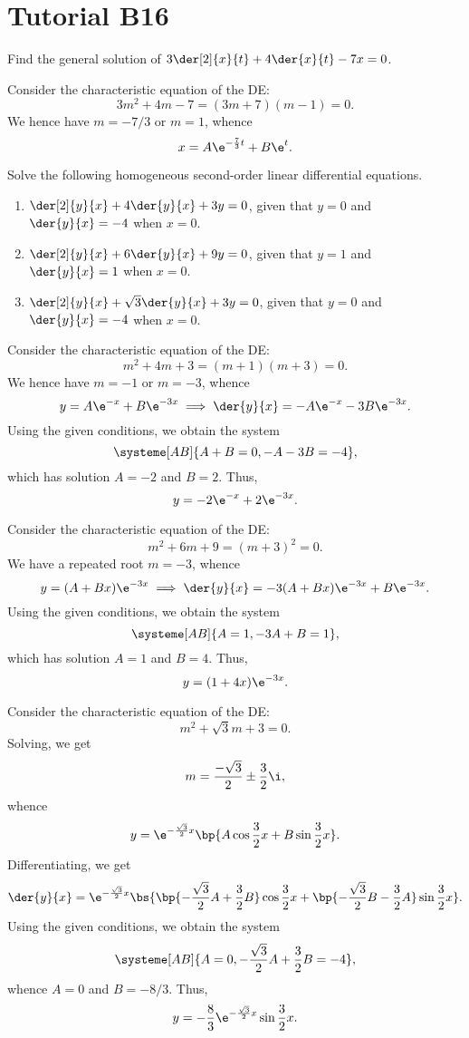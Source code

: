 \section{Tutorial B16}

\begin{problem}
    Find the general solution of $3\der[2]{x}{t} + 4\der{x}{t} -7x = 0$.
\end{problem}
\begin{solution}
    Consider the characteristic equation of the DE: \[3m^2 + 4m - 7 = (3m+7)(m-1) = 0.\] We hence have $m = -7/3$ or $m = 1$, whence \[x = A \e^{-\frac73 t} + B \e^t.\]
\end{solution}

\begin{problem}
    Solve the following homogeneous second-order linear differential equations.
    \begin{enumerate}
        \item $\der[2]{y}{x} + 4\der{y}{x} + 3y = 0$, given that $y = 0$ and $\der{y}{x} = -4$ when $x = 0$.
        \item $\der[2]{y}{x} + 6\der{y}{x} + 9y = 0$, given that $y = 1$ and $\der{y}{x} = 1$ when $x = 0$.
        \item $\der[2]{y}{x} + \sqrt3 \der{y}{x} + 3y = 0$, given that $y = 0$ and $\der{y}{x} = -4$ when $x = 0$.
    \end{enumerate}
\end{problem}
\begin{solution}
    \begin{ppart}
        Consider the characteristic equation of the DE: \[m^2 + 4m + 3 = (m+1)(m+3) = 0.\] We hence have $m = -1$ or $m = -3$, whence \[y = A\e^{-x} + B\e^{-3x} \implies \der{y}{x} = -A\e^{-x} - 3 B\e^{-3x}.\] Using the given conditions, we obtain the system \[\systeme[AB]{A + B = 0, -A - 3B = -4},\] which has solution $A = -2$ and $B = 2$. Thus, \[y = -2\e^{-x} + 2\e^{-3x}.\]
    \end{ppart}
    \begin{ppart}
        Consider the characteristic equation of the DE: \[m^2 + 6m + 9 = (m+3)^2 = 0.\] We have a repeated root $m = -3$, whence \[y = (A + Bx) \e^{-3x} \implies \der{y}{x} = -3(A + Bx)\e^{-3x} + B\e^{-3x}.\] Using the given conditions, we obtain the system \[\systeme[AB]{A = 1, -3 A + B = 1},\] which has solution $A = 1$ and $B = 4$. Thus, \[y = (1 + 4x)\e^{-3x}.\]
    \end{ppart}
    \begin{ppart}
        Consider the characteristic equation of the DE: \[m^2 + \sqrt3 m + 3 = 0.\] Solving, we get \[m = \frac{-\sqrt3}{2} \pm \frac{3}{2} \i,\] whence \[y = \e^{-\frac{\sqrt3}2 x} \bp{A \cos \frac32 x + B \sin \frac32 x}.\] Differentiating, we get \[\der{y}{x} = \e^{-\frac{\sqrt3}2 x} \bs{\bp{-\frac{\sqrt3}2 A + \frac32 B}\cos \frac32 x + \bp{-\frac{\sqrt3}{2} B - \frac32 A} \sin \frac32x}.\] Using the given conditions, we obtain the system \[\systeme[AB]{A = 0, -\frac{\sqrt3}{2}A + \frac32 B = -4},\] whence $A = 0$ and $B = -8/3$. Thus, \[y = -\frac83 \e^{-\frac{\sqrt3}2 x} \sin \frac32 x.\]
    \end{ppart}
\end{solution}

